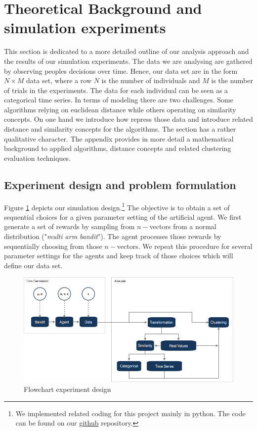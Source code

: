 \documentclass[12pt,a4paper,bibliography=totocnumbered,listof=totocnumbered]{scrartcl}
\begin{document}
\pagebreak

\section{Theoretical Background and simulation experiments}

This section is dedicated to a more detailed outline of our analysis approach and the results of our simulation experiments. The data we are analysing are gathered by observing peoples decisions over time. Hence, our data set are in the form $N \times M$ data set, where a row $N$ is the number of individuals and $M$ is the number of trials in the experiments. The data for each individual can be seen as a categorical time series. In terms of modeling there are two challenges. Some algorithms relying on euclidean distance while others operating on similarity concepts. On one hand we introduce how repress those data and introduce related distance and similarity concepts for the algorithms. The section has a rather qualitative character. The appendix provides in more detail a mathematical background to applied algorithms, distance concepts and related clustering evaluation techniques. 

\subsection{Experiment design and problem formulation}

Figure \ref{fig:flow} depicts our simulation design.\footnote{ We implemented related coding for this project mainly in python. The code can be found on our  \href{https://github.com/FelixGSE/Master-Project}{github} repository.} The objective is to obtain a set of sequential choices for a given parameter setting of the artificial agent. We first generate a set of rewards by sampling from $n-$vectors from a normal distribution ("\textit{multi arm bandit}"). The agent processes those rewards by sequentially choosing from those $n-$vectors.  We repeat this procedure for several parameter settings for the agents and keep track of those choices which will define our data set.

 \begin{figure}[!htb]
	\includegraphics[width=\textwidth]{Pictures/flow01.png}
	\caption{Flowchart experiment design}
	\label{fig:flow}
\end{figure}
\end{document}
